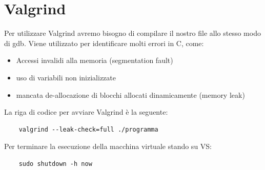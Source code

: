 \section{Valgrind}
Per utilizzare Valgrind avremo bisogno di compilare il nostro file allo stesso modo di gdb. Viene utilizzato per identificare molti errori in C, come:
\begin{itemize}
    \item Accessi invalidi alla memoria (segmentation fault)
    \item uso di variabili non inizializzate
    \item mancata de-allocazione di blocchi allocati dinamicamente (memory leak)
\end{itemize}
La riga di codice per avviare Valgrind è la seguente:
\begin{verbatim}
    valgrind --leak-check=full ./programma
\end{verbatim}
Per terminare la esecuzione della macchina virtuale stando su VS:
\begin{verbatim}
    sudo shutdown -h now 
\end{verbatim}
